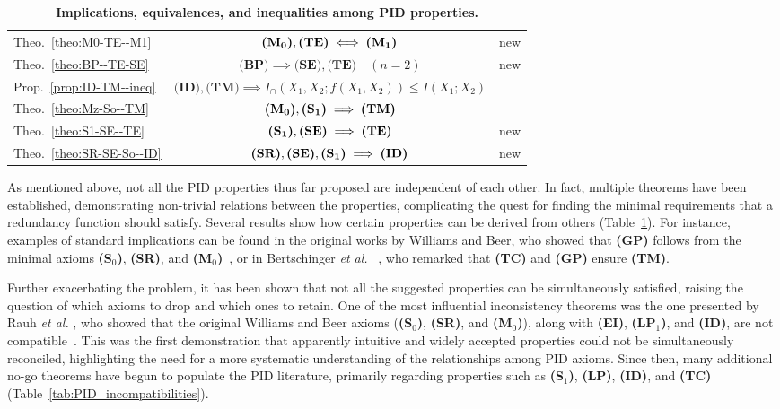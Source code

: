 \documentclass{article}
\makeatletter
\newcommand{\etal}{\textit{et al.\@} }
\newcommand{\ts}[1]{\ensuremath{_{\text{#1}}}}
\newcommand{\SR}{\textbf{(SR)}\xspace} %
\newcommand{\Sz}{\textbf{(S\ts{0})}\xspace} %
\newcommand{\Mz}{\textbf{(M\ts{0})}\xspace} %
\newcommand{\GP}{\textbf{(GP)}\xspace} %
\newcommand{\ID}{\textbf{(ID)}\xspace} %
\newcommand{\TM}{\textbf{(TM)}\xspace} %
\newcommand{\TC}{\textbf{(TC)}\xspace} %
\newcommand{\So}{\textbf{(S\ts{1})}\xspace} %
\newcommand{\Mo}{\textbf{(M\ts{1})}\xspace} %
\newcommand{\LPo}{\textbf{(LP\ts{1})}\xspace} %
\newcommand{\BP}{\textbf{(BP)}\xspace} %
\newcommand{\TE}{\textbf{(TE)}\xspace} %
\newcommand{\EI}{\textbf{(EI)}\xspace} %
\newcommand{\SE}{\textbf{(SE)}\xspace} %
\newcommand{\LP}{\textbf{(LP)}\xspace}
\newenvironment{DIFnomarkup}{}
\makeatother
\begin{document}
\begin{DIFnomarkup}
\begin{table}[t]
\begin{tabular}{lcr}
Theo.~\ref{theo:M0-TE--M1} 
    & $\Mz, \TE \iff \Mo$ 
    & new \\

Theo.~\ref{theo:BP--TE-SE} 
    & $\BP \implies \SE, \TE \quad (n=2)$ 
    & new \\
    
Prop.~\ref{prop:ID-TM--ineq} 
    & $\ID, \TM \implies I_\cap(X_1,X_2;f(X_1,X_2)) \le I(X_1;X_2)$ 
    & \cite{banerjee2015synergy} \\

\midrule
Theo.~\ref{theo:Mz-So--TM} 
    & $\Mz, \So \implies \TM$ 
    & \cite{bertschinger2013shared} \\

Theo.~\ref{theo:S1-SE--TE} 
    & $\So, \SE \implies \TE$ 
    & new \\

Theo.~\ref{theo:SR-SE-So--ID} 
    & $\SR, \SE, \So \implies \ID$ 
    & new \\
\bottomrule
\end{tabular}
\caption{\textbf{Implications, equivalences, and inequalities among PID properties.}}
\label{tab:PID_implications}
\end{table}
\end{DIFnomarkup}

As mentioned above, not all the PID properties thus far proposed are independent of each other. 
In fact, multiple theorems have been established, demonstrating non-trivial relations between the properties, complicating the quest for finding the minimal requirements that a redundancy function should satisfy. Several results show how certain properties can be derived from others (Table~\ref{tab:PID_implications}). For instance, examples of standard implications can be found in the original works by Williams and Beer, who showed that \GP follows from the minimal axioms \Sz, \SR, and \Mz~\cite{williams2010nonnegative}, or in Bertschinger \etal~\cite{bertschinger2013shared}, who remarked that \TC and \GP ensure \TM. 

Further exacerbating the problem, it has been shown that not all the suggested properties can be simultaneously satisfied, raising the question of which axioms to drop and which ones to retain. One of the most influential inconsistency theorems was the one presented by Rauh \etal, who showed that the original Williams and Beer axioms (\Sz, \SR, and \Mz), along with \EI, \LPo, and \ID, are not compatible~\cite{rauh2014reconsidering}. This was the first demonstration that apparently intuitive and widely accepted properties could not be simultaneously reconciled, highlighting the need for a more systematic understanding of the relationships among PID axioms. Since then, many additional no-go theorems have begun to populate the PID literature, primarily regarding properties such as \So, \LP, \ID, and \TC (Table~\ref{tab:PID_incompatibilities}).
\end{document}
